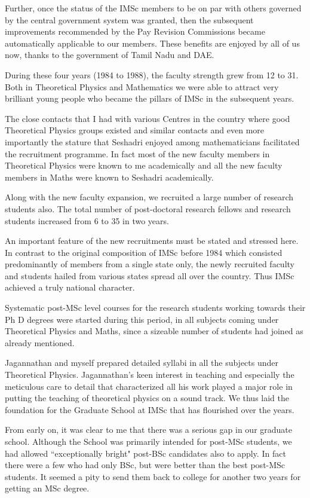 Further, once the status of the IMSc members to be on par with others 
governed by the central government system was granted, then the 
subsequent improvements recommended by the Pay Revision Commissions 
became automatically applicable to our members. These benefits are 
enjoyed by all of us now, thanks to the government of Tamil Nadu and 
DAE.
\smallskip

During these four years (1984 to 1988), the faculty strength grew from 
12 to 31. Both in Theoretical Physics and Mathematics we were able to 
attract very brilliant young people who became the pillars of IMSc in 
the subsequent years.
\smallskip

The close contacts that I had with various Centres in the country where 
good Theoretical Physics groups existed and similar contacts and even 
more importantly the stature that Seshadri enjoyed among mathematicians 
facilitated the recruitment programme. In fact most of the new faculty 
members in Theoretical Physics were known to me academically and all the 
new faculty members in Maths were known to Seshadri academically.
\smallskip

Along with the new faculty expansion, we recruited a large number of 
research students also. The total number of post-doctoral research 
fellows and research students increased from 6 to 35 in two years.
\smallskip

An important feature of the new recruitments must be stated and stressed 
here. In contrast to the original composition of IMSc before 1984 which 
consisted predominantly of members from a single state only, the newly 
recruited faculty and students hailed from various states spread all 
over the country. Thus IMSc achieved a truly national character.
\smallskip

Systematic post-MSc level courses for the research students working 
towards their Ph D degrees were started during this period, in all 
subjects coming under Theoretical Physics and Maths, since a sizeable 
number of students had joined as already mentioned.
\smallskip

Jagannathan and myself prepared detailed syllabi in all the subjects 
under Theoretical Physics. Jagannathan's keen interest in teaching and 
especially the meticulous care to detail that characterized all his work 
played a major role in putting the teaching of theoretical physics on a 
sound track. We thus laid the foundation for the Graduate School at IMSc 
that has flourished over the years.
\smallskip

From early on, it was clear to me that there was a serious gap in our 
graduate school. Although the School was primarily intended for post-MSc 
students, we had allowed ``exceptionally bright" post-BSc candidates also 
to apply. In fact there were a few who had only BSc, but were better than 
the best post-MSc students. It seemed a pity to send them back to 
college for another two years for getting an MSc degree.
\smallskip

